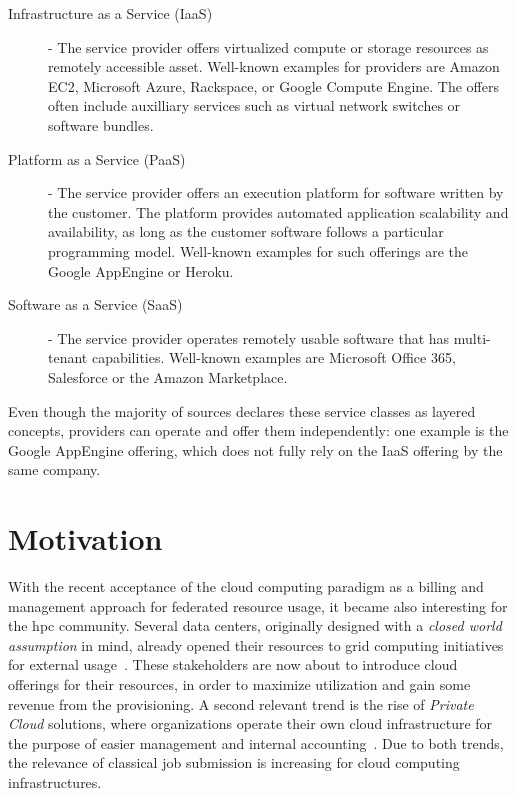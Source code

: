 \documentclass[twocolumn]{svjour3}       %
\begin{document}
\begin{description}
\item[Infrastructure as a Service (IaaS)] - The service provider offers virtualized compute or storage resources as remotely accessible asset. Well-known examples for providers are Amazon EC2, Microsoft Azure, Rackspace, or Google Compute Engine. The offers often include auxilliary services such as virtual network switches or software bundles. 
\item[Platform as a Service (PaaS)] - The service provider offers an execution platform for software written by the customer. The platform provides automated application scalability and availability, as long as the customer software follows a particular programming model. Well-known examples for such offerings are the Google AppEngine or Heroku.
\item[Software as a Service (SaaS)] - The service provider operates remotely usable software that has multi-tenant capabilities. Well-known examples are Microsoft Office 365, Salesforce or the Amazon Marketplace. 
\end{description}

Even though the majority of sources declares these service classes as layered concepts, providers can operate and offer them independently: one example is the Google AppEngine offering, which does not fully rely on the IaaS offering by the same company.

\section{Motivation}

With the recent acceptance of the cloud computing paradigm as a billing and management approach for federated resource usage, it became also interesting for the \gls{hpc} community. Several data centers, originally designed with a \emph{closed world assumption} in mind, already opened their resources to grid computing initiatives for external usage~\cite{unicore}. These stakeholders are now about to introduce cloud offerings for their resources, in order to maximize utilization and gain some revenue from the provisioning. A second relevant trend is the rise of \emph{Private Cloud} solutions, where organizations operate their own cloud infrastructure for the purpose of easier management and internal accounting~\cite{citemaster_9646}. Due to both trends, the relevance of classical job submission is increasing for cloud computing infrastructures. 
\end{document}
